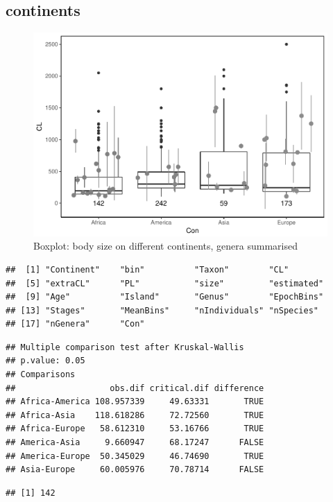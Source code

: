 \documentclass[]{article}
\begin{document}
\newpage

\subsection{continents}\label{continents-1}

\begin{figure}[htbp]
\centering
\includegraphics{MA_JJ_files/figure-latex/BPCon-1.pdf}
\caption{Boxplot: body size on different continents, genera summarised}
\end{figure}

\begin{verbatim}
##  [1] "Continent"    "bin"          "Taxon"        "CL"          
##  [5] "extraCL"      "PL"           "size"         "estimated"   
##  [9] "Age"          "Island"       "Genus"        "EpochBins"   
## [13] "Stages"       "MeanBins"     "nIndividuals" "nSpecies"    
## [17] "nGenera"      "Con"
\end{verbatim}

\begin{verbatim}
## Multiple comparison test after Kruskal-Wallis 
## p.value: 0.05 
## Comparisons
##                   obs.dif critical.dif difference
## Africa-America 108.957339     49.63331       TRUE
## Africa-Asia    118.618286     72.72560       TRUE
## Africa-Europe   58.612310     53.16766       TRUE
## America-Asia     9.660947     68.17247      FALSE
## America-Europe  50.345029     46.74690       TRUE
## Asia-Europe     60.005976     70.78714      FALSE
\end{verbatim}

\begin{verbatim}
## [1] 142
\end{verbatim}
\end{document}
